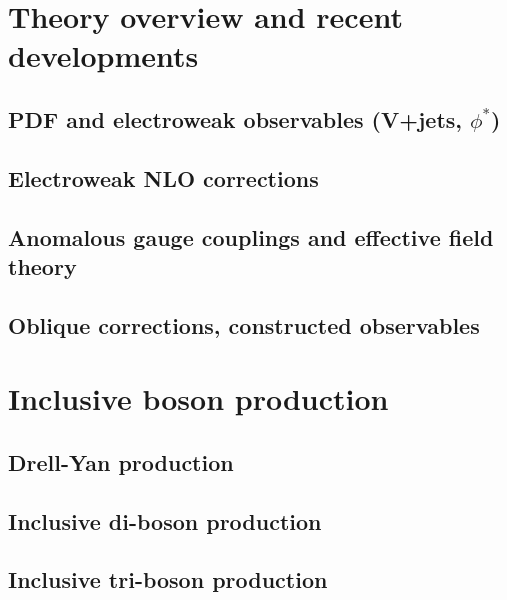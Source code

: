 \documentclass[12pt]{iopart}
\begin{document}
\section{Theory overview and recent developments}
\label{s-theory-overview}
\subsection{PDF and electroweak observables (V+jets, $\phi^*$)}
\subsection{Electroweak NLO corrections}
\subsection{Anomalous gauge couplings and effective field theory}
\subsection{Oblique corrections, constructed observables}


\section{Inclusive boson production}
\label{s-inclboson}
\subsection{Drell-Yan production}
\label{ss-inclboson-drellyan}

\subsection{Inclusive di-boson production}










\subsection{Inclusive tri-boson production}

\end{document}
